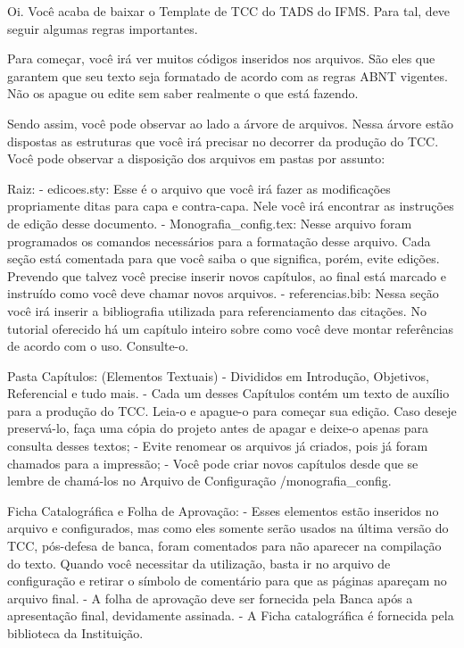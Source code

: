 Oi.
Você acaba de baixar o Template de TCC do TADS do IFMS.
Para tal, deve seguir algumas regras importantes.

Para começar, você irá ver muitos códigos inseridos nos arquivos. São eles que garantem que seu texto seja formatado de acordo com as regras ABNT vigentes. Não os apague ou edite sem saber realmente o que está fazendo.

Sendo assim, você pode observar ao lado a árvore de arquivos. Nessa árvore estão dispostas as estruturas que você irá precisar no decorrer da produção do TCC. Você pode observar a disposição dos arquivos em pastas por assunto:

Raiz: 
- edicoes.sty: Esse é o arquivo que você irá fazer as modificações propriamente ditas para capa e contra-capa. Nele você irá encontrar as instruções de edição desse documento.
- Monografia\_config.tex: Nesse arquivo foram programados os comandos necessários para a formatação desse arquivo. Cada seção está comentada para que você saiba o que significa, porém, evite edições. Prevendo que talvez você precise inserir novos capítulos, ao final está marcado e instruído como você deve chamar novos arquivos.  
- referencias.bib: Nessa seção você irá inserir a bibliografia utilizada para referenciamento das citações. No tutorial oferecido há um capítulo inteiro sobre como você deve montar referências de acordo com o uso. Consulte-o.

Pasta Capítulos: (Elementos Textuais)
- Divididos em Introdução, Objetivos, Referencial e tudo mais.
- Cada um desses Capítulos contém um texto de auxílio para a produção do TCC. Leia-o e apague-o para começar sua edição. Caso deseje preservá-lo, faça uma cópia do projeto antes de apagar e deixe-o apenas para consulta desses textos;
- Evite renomear os arquivos já criados, pois já foram chamados para a impressão;
- Você pode criar novos capítulos desde que se lembre de chamá-los no Arquivo de Configuração /monografia\_config.

Ficha Catalográfica e Folha de Aprovação: 
- Esses elementos estão inseridos no arquivo e configurados, mas como eles somente serão usados na última versão do TCC, pós-defesa de banca, foram comentados para não aparecer na compilação do texto. Quando você necessitar da utilização, basta ir no arquivo de configuração e retirar o símbolo de comentário para que as páginas apareçam no arquivo final.
- A folha de aprovação deve ser fornecida pela Banca após a apresentação final, devidamente assinada.
- A Ficha catalográfica é fornecida pela biblioteca da Instituição.

